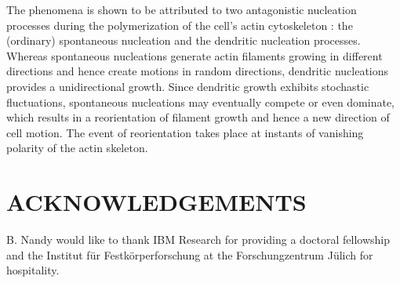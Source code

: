\documentclass[aps,preprint,pre,array,epsfig,eqsecnum]{revtex4}
\begin{document}
The phenomena is 
shown to be attributed to two antagonistic nucleation processes during
the polymerization of the cell's actin cytoskeleton : the (ordinary) spontaneous
nucleation  and the dendritic nucleation  processes.
Whereas spontaneous nucleations generate actin filaments growing in different 
directions and hence create motions in random directions, 
dendritic nucleations provides a unidirectional growth.
Since dendritic growth exhibits stochastic fluctuations,
spontaneous nucleations may eventually compete or even dominate, 
which results in a reorientation of filament growth and hence 
a new direction of cell motion.
The event of reorientation takes place at instants of vanishing
polarity of the actin skeleton.


\section*{ACKNOWLEDGEMENTS}
B. Nandy would like to thank IBM Research for providing a doctoral
fellowship and
the Institut f\"ur Festk\"orperforschung
at the Forschungzentrum J\"ulich for hospitality.





 
 

\end{document}
